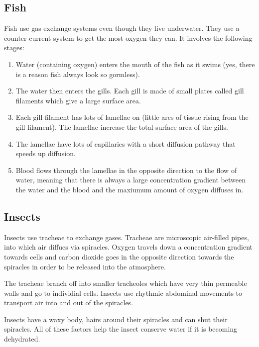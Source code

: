 \documentclass{article}
\begin{document}
\subsection*{Fish}

Fish use gas exchange systems even though they live underwater.
They use a counter-current system to get the most oxygen they can. It involves
the following stages:

\begin{enumerate}

	\item Water (containing oxygen) enters the mouth of the fish as it swims
	(yes, there is a reason fish always look so gormless).

	\item The water then enters the gills. Each gill is made of small plates
	called gill filaments which give a large surface area.

	\item Each gill filament has lots of lamellae on (little arcs of tissue
	rising from the gill filament). The lamellae increase the total surface
	area of the gills.

	\item The lamellae have lots of capillaries with a short diffusion pathway
	that speeds up diffusion.

	\item Blood flows through the lamellae in the opposite direction to the flow
	of water, meaning that there is always a large concentration gradient
	between the water and the blood and the maxiumum amount of oxygen diffuses
	in.

\end{enumerate}

\subsection*{Insects}

Insects use tracheae to exchange gases. Tracheae are microscopic air-filled
pipes, into which air diffues via spiracles. Oxygen travels down a concentration
gradient towards cells and carbon dioxide goes in the opposite direction towards
the spiracles in order to be released into the atmosphere.

The tracheae branch off into smaller tracheoles which have very thin permeable
walls and go to individial cells. Insects use rhythmic abdominal movements to
transport air into and out of the spiracles.

Insects have a waxy body, hairs around their spiracles and can shut their
spiracles. All of these factors help the insect conserve water if it is becoming
dehydrated.
\end{document}

